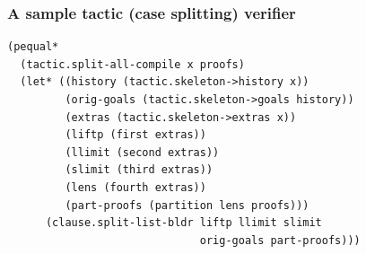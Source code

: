 \documentclass[10pt]{beamer}
\begin{document}
\begin{frame}[fragile]
\frametitle{A sample tactic (case splitting) verifier}
{\scriptsize
\begin{lstlisting}
(pequal* 
  (tactic.split-all-compile x proofs)
  (let* ((history (tactic.skeleton->history x))
         (orig-goals (tactic.skeleton->goals history))
         (extras (tactic.skeleton->extras x))
         (liftp (first extras))
         (llimit (second extras))
         (slimit (third extras))
         (lens (fourth extras))
         (part-proofs (partition lens proofs)))
      (clause.split-list-bldr liftp llimit slimit
                              orig-goals part-proofs)))
\end{lstlisting}
}
\end{frame}

\end{document}
